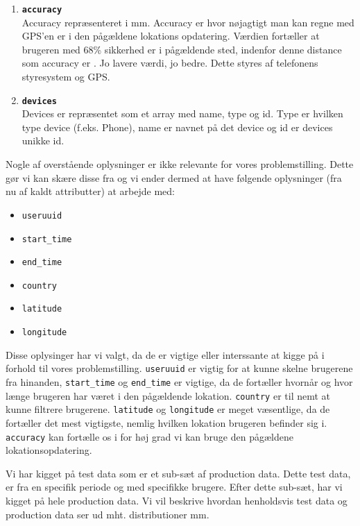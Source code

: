 \begin{enumerate}
\item \texttt{\textbf{accuracy}}\\Accuracy repræsenteret i mm. Accuracy er hvor nøjagtigt man kan regne med GPS'en er i den pågældene lokations opdatering. Værdien fortæller at brugeren med 68\% sikkerhed er i pågældende sted, indenfor denne distance som accuracy er \cite{android_accuracy}. Jo lavere værdi, jo bedre. Dette styres af telefonens styresystem og GPS.
\item \texttt{\textbf{devices}}\\Devices er repræsentet som et array med name, type og id. Type er hvilken type device (f.eks. Phone), name er navnet på det device og id er devices unikke id. 
\end{enumerate}

Nogle af overstående oplysninger er ikke relevante for vores problemstilling. Dette gør vi kan skære disse fra og vi ender dermed at have følgende oplysninger (fra nu af kaldt  attributter) at arbejde med: 

\begin{itemize}
\item \texttt{useruuid}
\item \texttt{start\_time}
\item \texttt{end\_time}
\item \texttt{country}
\item \texttt{latitude}
\item \texttt{longitude}
\end{itemize}

Disse oplysinger har vi valgt, da de er vigtige eller interssante at kigge på i forhold til vores problemstilling. \texttt{useruuid} er vigtig for at kunne skelne brugerene fra hinanden, \texttt{start\_time} og \texttt{end\_time} er vigtige, da de fortæller hvornår og hvor længe brugeren har været i den pågældende lokation. \texttt{country} er til nemt at kunne filtrere brugerene. \texttt{latitude} og \texttt{longitude} er meget væsentlige, da de fortæller det mest vigtigste, nemlig hvilken lokation brugeren befinder sig i. \texttt{accuracy} kan fortælle os i for høj grad vi kan bruge den pågældene lokationsopdatering.  


Vi har kigget på test data som er et sub-sæt af production data. Dette test data, er fra en specifik periode og med specifikke brugere. Efter dette sub-sæt, har vi kigget på hele production data. Vi vil beskrive hvordan henholdsvis test data og production data ser ud mht. distributioner mm. 

